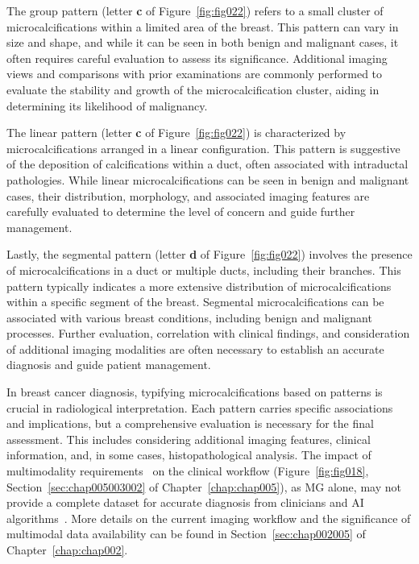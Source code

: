 The group pattern (letter {\bf c} of Figure~\ref{fig:fig022}) refers to a small cluster of microcalcifications within a limited area of the breast.
This pattern can vary in size and shape, and while it can be seen in both benign and malignant cases, it often requires careful evaluation to assess its significance.
Additional imaging views and comparisons with prior examinations are commonly performed to evaluate the stability and growth of the microcalcification cluster, aiding in determining its likelihood of malignancy.

The linear pattern (letter {\bf c} of Figure~\ref{fig:fig022}) is characterized by microcalcifications arranged in a linear configuration.
This pattern is suggestive of the deposition of calcifications within a duct, often associated with intraductal pathologies.
While linear microcalcifications can be seen in benign and malignant cases, their distribution, morphology, and associated imaging features are carefully evaluated to determine the level of concern and guide further management.

Lastly, the segmental pattern (letter {\bf d} of Figure~\ref{fig:fig022}) involves the presence of microcalcifications in a duct or multiple ducts, including their branches.
This pattern typically indicates a more extensive distribution of microcalcifications within a specific segment of the breast.
Segmental microcalcifications can be associated with various breast conditions, including benign and malignant processes.
Further evaluation, correlation with clinical findings, and consideration of additional imaging modalities are often necessary to establish an accurate diagnosis and guide patient management.

In breast cancer diagnosis, typifying microcalcifications based on patterns is crucial in radiological interpretation.
Each pattern carries specific associations and implications, but a comprehensive evaluation is necessary for the final assessment.
This includes considering additional imaging features, clinical information, and, in some cases, histopathological analysis.
The impact of multimodality requirements~\cite{https://doi.org/10.1002/cncr.32910} on the clinical workflow \textcolor{revised}{(Figure~\ref{fig:fig018}, Section~\ref{sec:chap005003002} of Chapter~\ref{chap:chap005})}, as \ac{MG} alone, may not provide a complete dataset for accurate diagnosis from clinicians and \ac{AI} algorithms~\cite{DANA2020541}.
More details on the current imaging workflow and the significance of multimodal data availability can be found in Section~\ref{sec:chap002005} of Chapter~\ref{chap:chap002}.

